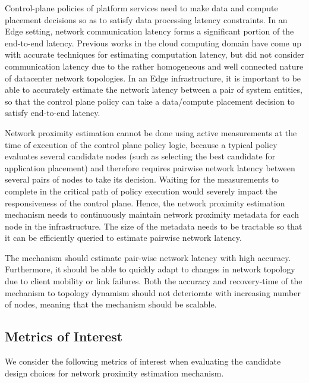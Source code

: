 Control-plane policies of platform services need to make data and compute placement decisions so as to satisfy data processing latency constraints. In an Edge setting, network communication latency forms a significant portion of the end-to-end latency. Previous works in the cloud computing domain have come up with accurate techniques for estimating computation latency, but did not consider communication latency due to the rather homogeneous and well connected nature of datacenter network topologies. In an Edge infrastructure, it is important to be able to accurately estimate the network latency between a pair of system entities, so that the control plane policy can take a data/compute placement decision to satisfy end-to-end latency.
\par Network proximity estimation cannot be done using active measurements at the time of execution of the control plane policy logic, because a typical policy evaluates several candidate nodes (such as selecting the best candidate for application placement) and therefore  requires pairwise network latency between several pairs of nodes to take its decision. Waiting for the measurements to complete in the critical path of policy execution would severely impact the responsiveness of the control plane. Hence, the network proximity estimation mechanism needs to continuously maintain network proximity metadata for each node in the infrastructure. The size of the metadata needs to be tractable so that it can be efficiently queried to estimate pairwise network latency.
\par The mechanism should estimate pair-wise network latency with high accuracy. Furthermore, it should be able to quickly adapt to changes in network topology due to client mobility or link failures. Both the accuracy and recovery-time of the mechanism to topology dynamism should not deteriorate with increasing number of nodes, meaning that the mechanism should be scalable.

\subsection{Metrics of Interest}
We consider the following metrics of interest when evaluating the candidate design choices for network proximity estimation mechanism.

